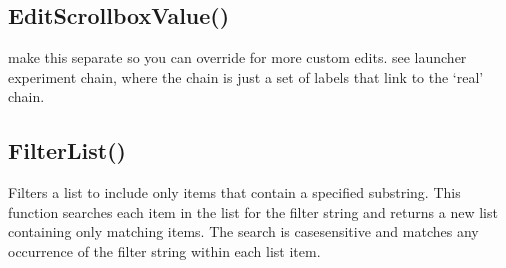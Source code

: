 \documentclass[letterpaper,10pt,english]{sphinxmanual}
\begin{document}
\sphinxAtStartPar
{}

\begin{sphinxVerbatim}[commandchars=\\\{\}]
\end{sphinxVerbatim}

\ignorespaces 

\subsection{EditScrollboxValue()}
\label{\detokenize{reference/ui:editscrollboxvalue}}\label{\detokenize{reference/ui:index-8}}
\sphinxAtStartPar
{}

\sphinxAtStartPar
make this separate so you can override for more custom edits.
see launcher experiment chain, where the chain is just a set of labels
that link to the ‘real’ chain.

\sphinxAtStartPar
{}

\begin{sphinxVerbatim}[commandchars=\\\{\}]
\end{sphinxVerbatim}

\ignorespaces 

\subsection{FilterList()}
\label{\detokenize{reference/ui:filterlist}}\label{\detokenize{reference/ui:index-9}}
\sphinxAtStartPar
{}

\sphinxAtStartPar
{}

\sphinxAtStartPar
Filters a list to include only items that contain a specified substring. This function searches each item in the list for the filter string and returns a new list containing only matching items. The search is case\sphinxhyphen{}sensitive and matches any occurrence of the filter string within each list item.

\sphinxAtStartPar
{}
\end{document}
